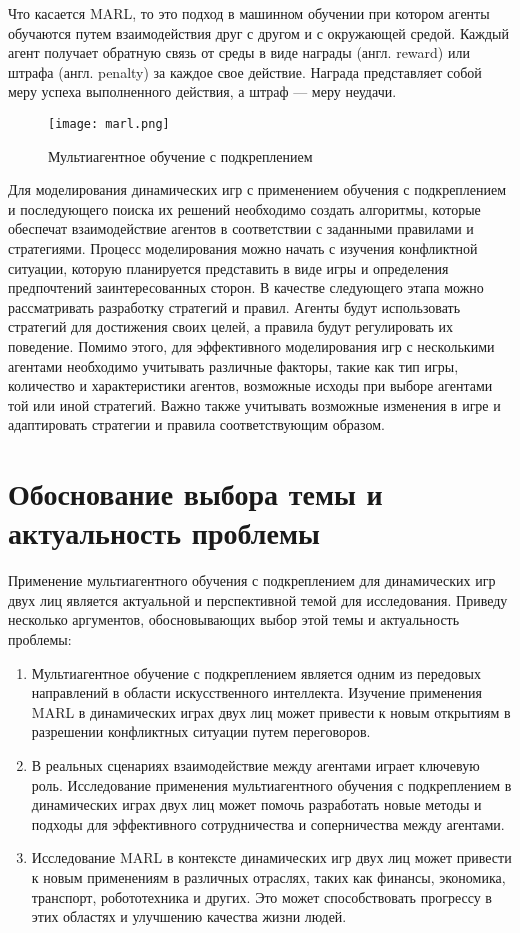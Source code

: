 Что касается MARL, то это подход в машинном обучении при котором агенты обучаются путем взаимодействия друг с другом и с окружающей средой. Каждый агент получает обратную связь от среды в виде награды (англ. reward) или штрафа (англ. penalty) за каждое свое действие. Награда представляет собой меру успеха выполненного действия, а штраф --- меру неудачи.

\begin{figure}[h]
  \centering
  \texttt{[image: marl.png]}
  \caption{Мультиагентное обучение с подкреплением}
\end{figure}

Для моделирования динамических игр с применением обучения с подкреплением и последующего поиска их решений необходимо создать алгоритмы, которые обеспечат взаимодействие агентов в соответствии с заданными правилами и стратегиями. Процесс моделирования можно начать с изучения конфликтной ситуации, которую планируется представить в виде игры и определения предпочтений заинтересованных сторон. В качестве следующего этапа можно рассматривать разработку стратегий и правил. Агенты будут использовать стратегий для достижения своих целей, а правила будут регулировать их поведение. Помимо этого, для эффективного моделирования игр с несколькими агентами необходимо учитывать различные факторы, такие как тип игры, количество и характеристики агентов, возможные исходы при выборе агентами той или иной стратегий. Важно также учитывать возможные изменения в игре и адаптировать стратегии и правила соответствующим образом.


\section{Обоснование выбора темы и актуальность проблемы}

Применение мультиагентного обучения с подкреплением для динамических игр двух лиц является актуальной и перспективной темой для исследования. Приведу несколько аргументов, обосновывающих выбор этой темы и актуальность проблемы:

\begin{enumerate}
    \item Мультиагентное обучение с подкреплением является одним из передовых направлений в области искусственного интеллекта. Изучение применения MARL в динамических играх двух лиц может привести к новым открытиям в разрешении конфликтных ситуации путем переговоров.

    \item В реальных сценариях взаимодействие между агентами играет ключевую роль. Исследование применения мультиагентного обучения с подкреплением в динамических играх двух лиц может помочь разработать новые методы и подходы для эффективного сотрудничества и соперничества между агентами.

    \item Исследование MARL в контексте динамических игр двух лиц может привести к новым применениям в различных отраслях, таких как финансы, экономика, транспорт, робототехника и других. Это может способствовать прогрессу в этих областях и улучшению качества жизни людей.

\end{enumerate}

